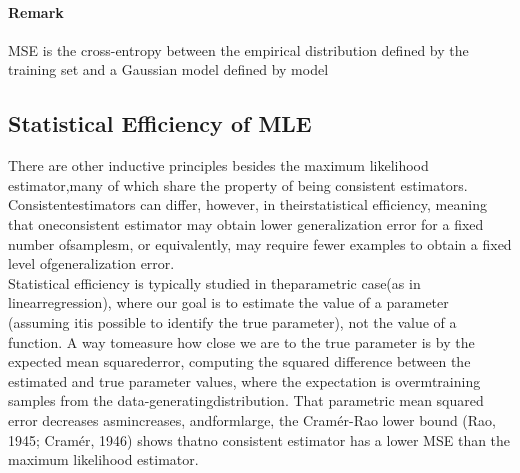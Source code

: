 \documentclass[12pt, a4paper]{article}
\begin{document}
\paragraph{Remark}
MSE is the cross-entropy between the empirical distribution defined by the training set and a Gaussian model defined by model


\newpage
\begin{appendices}

\section{Statistical Efficiency of MLE}
\label{app:se_mle}
There are other inductive principles besides the maximum likelihood estimator,many of which share the property of being consistent estimators. Consistentestimators can diﬀer, however, in theirstatistical eﬃciency, meaning that oneconsistent estimator may obtain lower generalization error for a ﬁxed number ofsamplesm, or equivalently, may require fewer examples to obtain a ﬁxed level ofgeneralization error.
\\
Statistical eﬃciency is typically studied in theparametric case(as in linearregression), where our goal is to estimate the value of a parameter (assuming itis possible to identify the true parameter), not the value of a function. A way tomeasure how close we are to the true parameter is by the expected mean squarederror, computing the squared diﬀerence between the estimated and true parameter values, where the expectation is overmtraining samples from the data-generatingdistribution. That parametric mean squared error decreases asmincreases, andformlarge, the Cramér-Rao lower bound (Rao, 1945; Cramér, 1946) shows thatno consistent estimator has a lower MSE than the maximum likelihood estimator.

\end{appendices}
\end{document}
